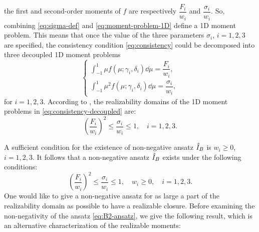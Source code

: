 the first and second-order moments of $f$ are respectively 
$\dfrac{F_i}{w_i}$ and $\dfrac{\sigma_i}{w_i}$. So,
combining \eqref{eq:sigma-def} and \eqref{eq:moment-problem-1D} define
a 1D moment problem. This means that once the value of the three parameters $\sigma_i$, 
$i = 1,2,3$ are specified, the consistency condition \eqref{eq:consistency} could 
be decomposed into three decoupled 1D moment problems
\begin{equation}\label{eq:consistency-decoupled}
  \left\{
  \begin{array}{l}
     \int_{-1}^1 \mu f(\mu;\gamma_i,\delta_i)
     \dd\mu = \dfrac{F_i}{w_i}, \\ [5mm]
     \int_{-1}^1 \mu^2 f(\mu;\gamma_i,\delta_i)
    \dd\mu = \dfrac{\sigma_i}{w_i},
  \end{array}\right.
\end{equation}
for $i = 1,2,3$.
According to \cite{CurFial91}, the realizability domains
of the 1D moment problems in \eqref{eq:consistency-decoupled}
are: 
\begin{equation}\label{eq:condition-realizable}
  \left(\dfrac{F_i}{w_i}\right)^2
  \leq\dfrac{\sigma_i}{w_i}\leq 1, \quad i = 1,2,3.
\end{equation}

A sufficient condition for the existence of non-negative
ansatz $\hat I_B$ is $w_i \geq 0$, $i = 1,2,3$. It follows that 
a non-negative ansatz $\hat I_B$ exists under the following conditions:
\begin{equation}\label{eq:condition-positive-ansatz}
  \left(\dfrac{F_i}{w_i}\right)^2
  \leq\dfrac{\sigma_i}{w_i}\leq 1, \quad
  w_i \geq 0, \quad i = 1,2,3.
\end{equation}
One would like to give a non-negative ansatz for as large a part of
the realizability domain as possible to have a realizable closure.
Before examining the non-negativity of the ansatz
\eqref{eq:B2-ansatz}, we give the following result, which is an
alternative characterization of the realizable moments:

